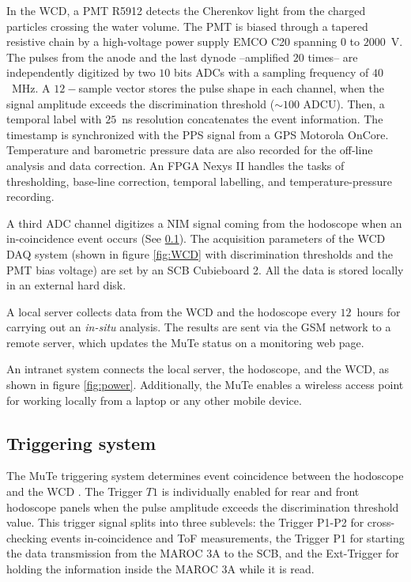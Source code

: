 \documentclass[letterpaper,11pt]{article}
\begin{document}
In the WCD, a PMT R5912 detects the Cherenkov light from the charged particles crossing the water volume. The PMT is biased through a tapered resistive chain by a high-voltage power supply EMCO C20 spanning $0$ to $2000$~V. The pulses from the anode and the last dynode --amplified $20$ times-- are independently digitized by two $10$ bits ADCs with a sampling frequency of $40$~MHz. A $12-$sample vector stores the pulse shape in each channel,  when the signal amplitude exceeds the discrimination threshold ($\sim 100$ ADCU).  Then, a temporal label with $25$~ns resolution concatenates the event information. The timestamp is synchronized with the PPS signal from a GPS Motorola OnCore. Temperature and barometric pressure data are also recorded for the off-line analysis and data correction. An FPGA Nexys II handles the tasks of thresholding, base-line correction, temporal labelling, and temperature-pressure recording.

A third ADC channel digitizes a NIM signal coming from the hodoscope when an in-coincidence event occurs (See \ref{trigger}). The acquisition parameters of the WCD DAQ system (shown in figure \ref{fig:WCD} with discrimination thresholds and the PMT bias voltage) are set by an SCB Cubieboard 2. All the data is stored locally in an external hard disk. 

A local server collects data from the WCD and the hodoscope every $12$~hours for carrying out an \textit{in-situ} analysis. The results are sent via the GSM network to a remote server, which updates the MuTe status on a monitoring web page.

An intranet system connects the local server, the hodoscope, and the WCD, as shown in figure \ref{fig:power}. Additionally, the MuTe enables a wireless access point for working locally from a laptop or any other mobile device.

\subsection{Triggering system}
\label{trigger}
The MuTe triggering system determines event coincidence between the hodoscope and the WCD \cite{PenaRodriguez2019}. The Trigger $T1$ is individually enabled for rear and front hodoscope panels when the pulse amplitude exceeds the discrimination threshold value. This trigger signal splits into three sublevels: the Trigger P1-P2 for cross-checking events in-coincidence and ToF measurements, the Trigger P1 for starting the data transmission from the MAROC 3A to the SCB, and the Ext-Trigger for holding the information inside the MAROC 3A while it is read.
\end{document}

